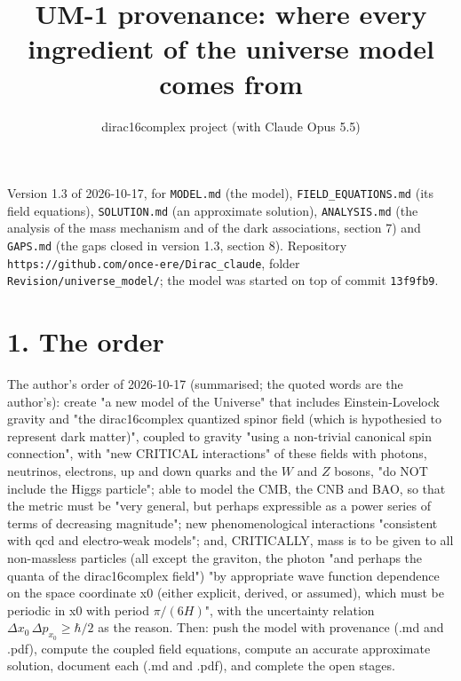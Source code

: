 \documentclass[11pt]{article}
\title{UM-1 provenance: where every ingredient of the universe model comes from}
\author{dirac16complex project (with Claude Opus 5.5)}
\date{}
\begin{document}
\maketitle
\tableofcontents
\newpage

Version 1.3 of 2026-10-17, for \texttt{MODEL.\allowbreak{}md} (the model), \texttt{FIELD\_\allowbreak{}EQUATIONS.\allowbreak{}md} (its field equations), \texttt{SOLUTION.\allowbreak{}md} (an approximate solution), \texttt{ANALYSIS.\allowbreak{}md} (the analysis of the mass mechanism and of the dark associations, section 7) and \texttt{GAPS.\allowbreak{}md} (the gaps closed in version 1.3, section 8). Repository \texttt{https:/\allowbreak{}/\allowbreak{}github.\allowbreak{}com/\allowbreak{}once-{}\allowbreak{}ere/\allowbreak{}Dirac\_\allowbreak{}claude}, folder \texttt{Revision/\allowbreak{}universe\_\allowbreak{}model/\allowbreak{}}; the model was started on top of commit \texttt{13f9fb9}.

\section*{1. The order}

The author's order of 2026-10-17 (summarised; the quoted words are the author's): create "a new model of the Universe" that includes Einstein-Lovelock gravity and "the dirac16complex quantized spinor field (which is hypothesied to represent dark matter)", coupled to gravity "using a non-trivial canonical spin connection", with "new CRITICAL interactions" of these fields with photons, neutrinos, electrons, up and down quarks and the $W$ and $Z$ bosons, "do NOT include the Higgs particle"; able to model the CMB, the CNB and BAO, so that the metric must be "very general, but perhaps expressible as a power series of terms of decreasing magnitude"; new phenomenological interactions "consistent with qcd and electro-weak models"; and, CRITICALLY, mass is to be given to all non-massless particles (all except the graviton, the photon "and perhaps the quanta of the dirac16complex field") "by appropriate wave function dependence on the space coordinate x0 (either explicit, derived, or assumed), which must be periodic in x0 with period $\pi/(6H)$", with the uncertainty relation $\Delta x_0\,\Delta p_{x_0} \geq \hbar/2$ as the reason. Then: push the model with provenance (.md and .pdf), compute the coupled field equations, compute an accurate approximate solution, document each (.md and .pdf), and complete the open stages.
\end{document}
